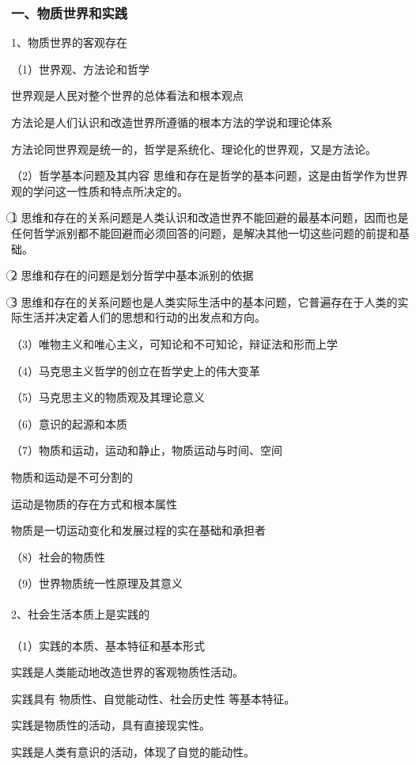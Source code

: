\documentclass{ctexart}
\begin{document}
\subsubsection{一、物质世界和实践}
1、物质世界的客观存在

（1）世界观、方法论和哲学

世界观是人民对整个世界的总体看法和根本观点

方法论是人们认识和改造世界所遵循的根本方法的学说和理论体系

方法论同世界观是统一的，哲学是系统化、理论化的世界观，又是方法论。

（2）哲学基本问题及其内容
思维和存在是哲学的基本问题，这是由哲学作为世界观的学问这一性质和特点所决定的。

\textcircled{1} 思维和存在的关系问题是人类认识和改造世界不能回避的最基本问题，因而也是任何哲学派别都不能回避而必须回答的问题，是解决其他一切这些问题的前提和基础。

\textcircled{2} 思维和存在的问题是划分哲学中基本派别的依据

\textcircled{3} 思维和存在的关系问题也是人类实际生活中的基本问题，它普遍存在于人类的实际生活并决定着人们的思想和行动的出发点和方向。

（3）唯物主义和唯心主义，可知论和不可知论，辩证法和形而上学

（4）马克思主义哲学的创立在哲学史上的伟大变革

（5）马克思主义的物质观及其理论意义

（6）意识的起源和本质

（7）物质和运动，运动和静止，物质运动与时间、空间

物质和运动是不可分割的

运动是物质的存在方式和根本属性

物质是一切运动变化和发展过程的实在基础和承担者

（8）社会的物质性

（9）世界物质统一性原理及其意义
\\\\

2、社会生活本质上是实践的
\\\\
（1）实践的本质、基本特征和基本形式

实践是人类能动地改造世界的客观物质性活动。

实践具有 物质性、自觉能动性、社会历史性 等基本特征。

实践是物质性的活动，具有直接现实性。

实践是人类有意识的活动，体现了自觉的能动性。
\end{document}
